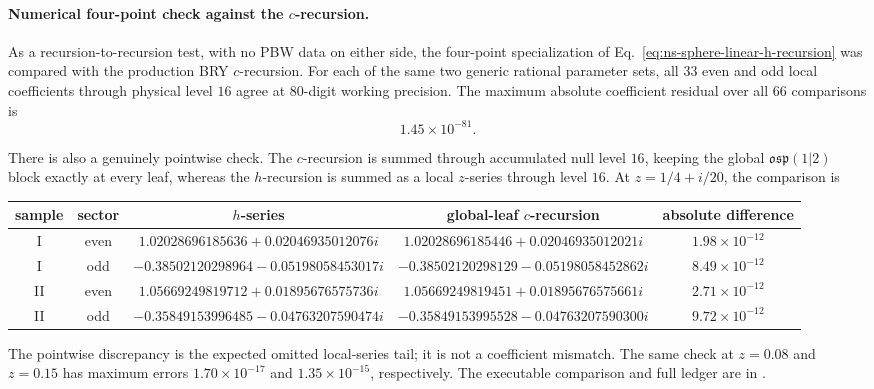 \documentclass[11pt]{article}
\begin{document}
\paragraph{Numerical four-point check against the \(c\)-recursion.}
As a recursion-to-recursion test, with no PBW data on either side, the
four-point specialization of
Eq.~\eqref{eq:ns-sphere-linear-h-recursion} was compared with the production
BRY \(c\)-recursion.  For each of the same two generic rational parameter
sets, all \(33\) even and odd local coefficients through physical level
\(16\) agree at \(80\)-digit working precision.  The maximum absolute
coefficient residual over all \(66\) comparisons is
\begin{equation}
 1.45\times10^{-81}.
 \label{eq:ns-sphere-linear-h-c-coefficient-check}
\end{equation}

There is also a genuinely pointwise check.  The \(c\)-recursion is summed
through accumulated null level \(16\), keeping the global
\(\mathfrak{osp}(1|2)\) block exactly at every leaf, whereas the
\(h\)-recursion is summed as a local \(z\)-series through level \(16\).
At \(z=1/4+i/20\), the comparison is
\begin{center}
\scriptsize
\setlength{\tabcolsep}{3pt}
\begin{tabular}{c c c c c}
\toprule
sample & sector & \(h\)-series & global-leaf \(c\)-recursion
 & absolute difference \\
\midrule
I & even
& \(1.02028696185636+0.02046935012076i\)
& \(1.02028696185446+0.02046935012021i\)
& \(1.98\times10^{-12}\) \\
I & odd
& \(-0.38502120298964-0.05198058453017i\)
& \(-0.38502120298129-0.05198058452862i\)
& \(8.49\times10^{-12}\) \\
II & even
& \(1.05669249819712+0.01895676575736i\)
& \(1.05669249819451+0.01895676575661i\)
& \(2.71\times10^{-12}\) \\
II & odd
& \(-0.35849153996485-0.04763207590474i\)
& \(-0.35849153995528-0.04763207590300i\)
& \(9.72\times10^{-12}\) \\
\bottomrule
\end{tabular}
\end{center}

The pointwise discrepancy is the expected omitted local-series tail; it is
not a coefficient mismatch.  The same check at \(z=0.08\) and \(z=0.15\)
has maximum errors \(1.70\times10^{-17}\) and
\(1.35\times10^{-15}\), respectively.  The executable comparison and full
ledger are in
.
\end{document}
